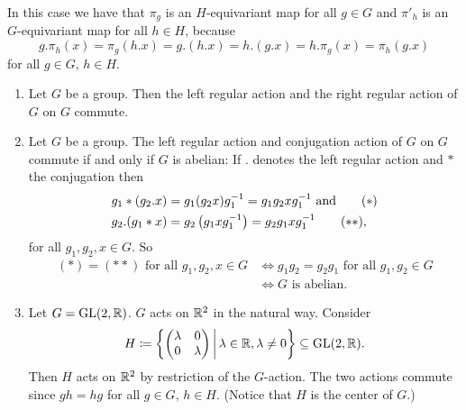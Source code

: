 \begin{rem}
  In this case we have that $\pi_g$ is an $H$-equivariant map for all $g \in G$ and $\pi'_h$ is an $G$-equivariant map for all $h \in H$, because
  \[
      g.\pi_h(x)
    = \pi_g(h.x)
    = g.(h.x)
    = h.(g.x)
    = h.\pi_g(x)
    = \pi_h(g.x)
  \]
  for all $g \in G$, $h \in H$.
\end{rem}


\begin{expls}
  \begin{enumerate}[label=\emph{\alph*)},leftmargin=*]
    \item
      Let $G$ be a group.
      Then the left regular action and the right regular action of $G$ on $G$ commute.
    \item
      Let $G$ be a group.
      The left regular action and conjugation action of $G$ on $G$ commute if and only if $G$ is abelian:
      If $.$ denotes the left regular action and $*$ the conjugation then
      \begin{align*}
            g_1*(g_2.x)
        &=  g_1 (g_2 x) g_1^{-1}
         =  g_1 g_2 x g_1^{-1}
        \text{ and}
        \tag{\ensuremath{\ast}}
        \\
            g_2.(g_1*x)
        &=  g_2 \left(g_1 x g_1^{-1}\right)
         =  g_2 g_1 x g_1^{-1}
        \tag{\ensuremath{\ast\ast}},
      \end{align*}
      for all $g_1, g_2, x \in G$. So
      \begin{align*}
                            (\ast)
                          = (\ast\ast)
                            \text{ for all }
                            g_1, g_2, x \in G
        &\Leftrightarrow    g_1 g_2
                          = g_2 g_1
                          \text{ for all }
                          g_1, g_2 \in G
        \\
        &\Leftrightarrow  \text{$G$ is abelian}.
      \end{align*}
    \item
      Let $G = \operatorname{GL}(2,\mathbb{R})$. $G$ acts on $\mathbb{R}^2$ in the natural way. Consider
      \[
                  H
        \coloneqq \left\{
                    \begin{pmatrix}
                      \lambda & 0       \\
                      0       &\lambda
                    \end{pmatrix}
                  \,\middle|\,
                    \lambda \in \mathbb{R},
                    \lambda \neq 0
                  \right\}
        \subseteq \operatorname{GL}(2,\mathbb{R}).
      \]
      Then $H$ acts on $\mathbb{R}^2$ by restriction of the $G$-action.
      The two actions commute since $gh = hg$ for all $g \in G$, $h \in H$.
      (Notice that $H$ is the center of $G$.)
  \end{enumerate}
\end{expls}





